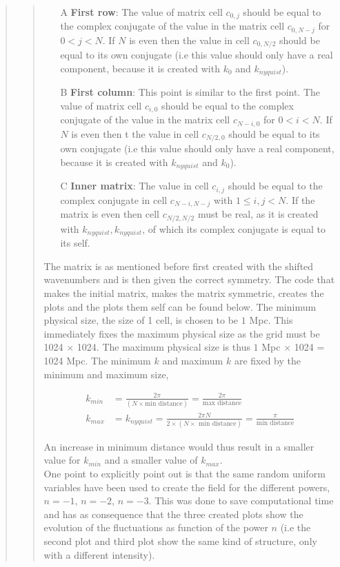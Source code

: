 \begin{quote}
\begin{quote}
\begin{enumerate}
\item[A] \textbf{First row}: The value of matrix cell $c_{0,j}$ should be equal to the complex conjugate of the value in the matrix cell $c_{0,N-j}$ for $ 0 < j< N$. If $N$ is even then  the  value in cell $c_{0,N/2}$ should be equal to its own conjugate (i.e this value should only have a real component, because it is created with $k_0$ and $k_{nyquist}$).
\item[B] \textbf{First column}: This point is similar to the first point. The value of matrix cell $c_{i,0}$ should be equal to the complex conjugate of the value in the matrix cell $c_{N-i,0}$ for $0 < i < N$. If $N$ is even then t the  value in cell $c_{N/2,0}$ should be equal to its own conjugate (i.e this value should only have a real component, because it is created with $k_{nyquist}$ and $k_{0}$).
\item[C] \textbf{Inner matrix}: The value in cell $c_{i,j}$ should be equal to the complex conjugate in cell $c_{N-i,N-j}$ with $1 \leq i, j < N$. If the matrix is even then cell $c_{N/2,N/2}$ must be real, as it is created with $k_{nyquist}, k_{nyquist}$, of which its complex conjugate is equal to its self. %
\end{enumerate}

The matrix is as mentioned before first created with the shifted wavenumbers and is then given the correct symmetry. The code that makes the initial matrix, makes the matrix symmetric, creates the plots and the plots them self can be found below. The minimum physical size, the size of 1 cell, is chosen to be $ 1$ Mpc. This immediately fixes the maximum physical size as the grid must be 1024 $\times$ 1024. The maximum physical size is thus $ 1$ Mpc $ \times $ 1024 = 1024 Mpc. The minimum $k$ and maximum $k$ are fixed by the minimum and maximum size,

\begin{align}
k_{min} &= \frac{2 \pi}{ ( N \times \text{min distance} )} = \frac{2 \pi }{\text{max distance}} \\
k_{max} &= k_{nyquist} = \frac{2 \pi N}{ 2 \times ( N \times \text{ min distance} )} = \frac{ \pi}{\text{min distance}}
\end{align}

An increase in minimum distance would thus result in a smaller value for $k_{min}$ and a smaller value of $k_{max}$.
\\
One point to explicitly point out is that the same random uniform variables have been used to create the field for the different powers, $n = -1$, $n = -2$, $n = -3$. This was done to save computational time and has as consequence that the three created plots show the evolution of the fluctuations as function of the power $n$ (i.e the second plot and third plot show the same kind of structure, only with a different intensity).


\end{quote}
\end{quote}
